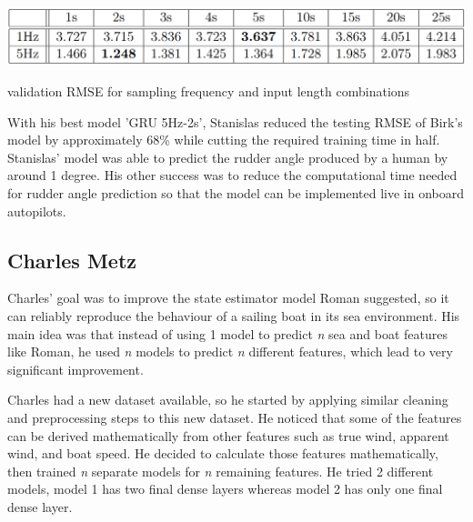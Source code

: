 \documentclass[12pt,twoside]{report}
\begin{document}
\begin{table}[h]
\centering
\includegraphics[width=\linewidth]{figures/stan grid search.png}
\caption{validation RMSE for sampling frequency and input length combinations \cite{stan}}
\label{tbl:stan grid}
\end{table}

With his best model 'GRU 5Hz-2s', Stanislas reduced the testing RMSE of Birk's model by approximately 68\% while cutting the required training time in half. Stanislas' model was able to predict the rudder angle produced by a human by around 1 degree. His other success was to reduce the computational time needed for rudder angle prediction so that the model can be implemented live in onboard autopilots.

\subsection{Charles Metz}
Charles' \cite{charles} goal was to improve the state estimator model Roman suggested, so it can reliably reproduce the behaviour of a sailing boat in its sea environment. His main idea was that instead of using 1 model to predict \emph{n} sea and boat features like Roman, he used \emph{n} models to predict \emph{n} different features, which lead to very significant improvement.

Charles had a new dataset available, so he started by applying similar cleaning and preprocessing steps to this new dataset. He noticed that some of the features can be derived mathematically from other features such as true wind, apparent wind, and boat speed. He decided to calculate those features mathematically, then trained \emph{n} separate models for \emph{n} remaining features. He tried 2 different models, model 1 has two final dense layers whereas model 2 has only one final dense layer.
\end{document}
